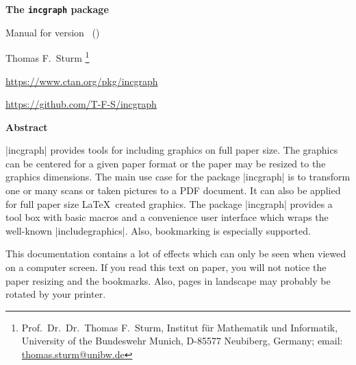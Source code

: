 \documentclass[a4paper,11pt]{ltxdoc}
\begin{document}
\begin{center}
\vspace*{5mm}
\begin{tcolorbox}[enhanced,
  center upper,width=10cm,boxrule=0.4pt,
  colback=white,colframe=black!50!yellow,drop fuzzy midday shadow=black!50!yellow]
{\bfseries\LARGE The \texttt{incgraph} package\par}\medskip
{\large Manual for version \version\ (\datum)\par}
\end{tcolorbox}\bigskip
{\large Thomas F.~Sturm%
  \footnote{Prof.~Dr.~Dr.~Thomas F.~Sturm, Institut f\"{u}r Mathematik und Informatik,
    University of the Bundeswehr Munich, D-85577 Neubiberg, Germany;
     email: \href{mailto:thomas.sturm@unibw.de}{thomas.sturm@unibw.de}}\par\medskip
\normalsize\url{https://www.ctan.org/pkg/incgraph}\par
\url{https://github.com/T-F-S/incgraph}
}
\end{center}
\bigskip
\begin{absquote}
  \begin{center}\bfseries Abstract\end{center}
  |incgraph| provides tools for including graphics on full paper size.
  The graphics can be centered for a given paper format or the paper may be
  resized to the graphics dimensions.
  The main use case for the package |incgraph| is to transform one or many scans
  or taken pictures to a PDF document. It can also be applied for full paper size
  \LaTeX\ created graphics.
  The package |incgraph| provides a tool box with basic macros and a
  convenience user interface which wraps the well-known |includegraphics|.
  Also, bookmarking is especially supported.
\end{absquote}

\enlargethispage*{1cm}
\tableofcontents

\begin{inctext}[paper=graphics]
  \begin{tcolorbox}[title={Caveat\hfill --- Page \thepage\ ---},
    colframe=red!65!black,colback=red!10!white,fonttitle=\Large\bfseries,
    fontupper=\large,arc=0mm,outer arc=0mm]
    This documentation contains a lot of effects which can only be seen
    when viewed on a computer screen. If you read this text on paper, you
    will not notice the paper resizing and the bookmarks. Also, pages in landscape may probably
    be rotated by your printer.
  \end{tcolorbox}
\end{inctext}
\end{document}
